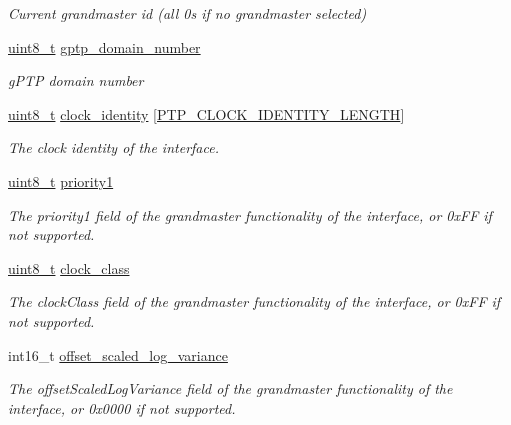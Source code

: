 \begin{DoxyCompactItemize}
\begin{DoxyCompactList}\small\item\em Current grandmaster id (all 0\textquotesingle{}s if no grandmaster selected) \end{DoxyCompactList}\item 
\hyperlink{stdint_8h_aba7bc1797add20fe3efdf37ced1182c5}{uint8\+\_\+t} \hyperlink{structg_ptp_time_data_ac53b4e61c0f960e16c86cfe678ca256d}{gptp\+\_\+domain\+\_\+number}
\begin{DoxyCompactList}\small\item\em g\+P\+TP domain number \end{DoxyCompactList}\item 
\hyperlink{stdint_8h_aba7bc1797add20fe3efdf37ced1182c5}{uint8\+\_\+t} \hyperlink{structg_ptp_time_data_af57b2186850d88240e6095da54758a2e}{clock\+\_\+identity} \mbox{[}\hyperlink{windows__ipc_8hpp_afd1566058ed7927c2b790c9d4a0051ec}{P\+T\+P\+\_\+\+C\+L\+O\+C\+K\+\_\+\+I\+D\+E\+N\+T\+I\+T\+Y\+\_\+\+L\+E\+N\+G\+TH}\mbox{]}
\begin{DoxyCompactList}\small\item\em The clock identity of the interface. \end{DoxyCompactList}\item 
\hyperlink{stdint_8h_aba7bc1797add20fe3efdf37ced1182c5}{uint8\+\_\+t} \hyperlink{structg_ptp_time_data_af98f08e3d1b016cd549310197ba8673c}{priority1}
\begin{DoxyCompactList}\small\item\em The priority1 field of the grandmaster functionality of the interface, or 0x\+FF if not supported. \end{DoxyCompactList}\item 
\hyperlink{stdint_8h_aba7bc1797add20fe3efdf37ced1182c5}{uint8\+\_\+t} \hyperlink{structg_ptp_time_data_aafe98ca785cdce0ce5eaa26f2930d2fe}{clock\+\_\+class}
\begin{DoxyCompactList}\small\item\em The clock\+Class field of the grandmaster functionality of the interface, or 0x\+FF if not supported. \end{DoxyCompactList}\item 
int16\+\_\+t \hyperlink{structg_ptp_time_data_a022841cfc4d83dc906f116eec53f1d9a}{offset\+\_\+scaled\+\_\+log\+\_\+variance}
\begin{DoxyCompactList}\small\item\em The offset\+Scaled\+Log\+Variance field of the grandmaster functionality of the interface, or 0x0000 if not supported. \end{DoxyCompactList}\item 

\end{DoxyCompactItemize}
